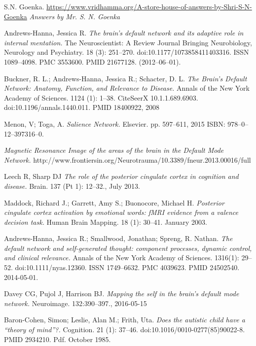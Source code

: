\documentclass[twocolumn]{article}
\begin{document}
\begin{thebibliography}{9}
\raggedright

  S.N. Goenka.
  \url{https://www.vridhamma.org/A-store-house-of-answers-by-Shri-S-N-Goenka}
  \textit{Answers by Mr. S. N. Goenka}

  Andrews-Hanna, Jessica R.
  \textit{The brain’s default network and its adaptive role in internal mentation.}
  The Neuroscientist: A Review Journal Bringing Neurobiology, Neurology and
  Psychiatry. 18 (3): 251–270. doi:10.1177/1073858411403316. ISSN 1089–4098. PMC
  3553600. PMID 21677128. (2012–06–01).

  Buckner, R. L.; Andrews-Hanna, Jessica R.; Schacter, D. L.
  \textit{The Brain's Default Network: Anatomy, Function, and Relevance to Disease.}
  Annals of the New York Academy of Sciences. 1124 (1): 1–38. CiteSeerX
  10.1.1.689.6903. doi:10.1196/annals.1440.011. PMID 18400922, 2008

  Menon, V; Toga, A.
  \textit{Salience Network.}
  Elsevier. pp. 597–611, 2015
  ISBN: 978–0–12–397316–0.

  \textit{Magnetic Resonance Image of the areas of the brain in the Default Mode Network.}
  http://www.frontiersin.org/Neurotrauma/10.3389/fneur.2013.00016/full

  Leech R, Sharp DJ
  \textit{The role of the posterior cingulate cortex in cognition and disease.}
  Brain. 137 (Pt 1): 12–32., July 2013.

  Maddock, Richard J.; Garrett, Amy S.; Buonocore, Michael H.
  \textit{Posterior cingulate cortex activation by emotional words: fMRI evidence from a
    valence decision task.}
  Human Brain Mapping. 18 (1): 30–41. January 2003.

  Andrews-Hanna, Jessica R.; Smallwood, Jonathan; Spreng, R. Nathan.
  \textit{The default network and self-generated thought: component processes,
    dynamic control, and clinical relevance.}
  Annals of the New York Academy of Sciences. 1316(1):
  29–52. doi:10.1111/nyas.12360. ISSN 1749–6632. PMC 4039623. PMID 24502540. 2014-05-01.

  Davey CG, Pujol J, Harrison BJ.
  \textit{Mapping the self in the brain’s default mode network.}
  Neuroimage. 132:390–397., 2016-05-15

  Baron-Cohen, Simon; Leslie, Alan M.; Frith, Uta.
  \textit{Does the autistic child have a ``theory of mind''?.}
  Cognition. 21 (1): 37–46. doi:10.1016/0010-0277(85)90022-8. PMID
  2934210. Pdf. October 1985.


\end{thebibliography}
\end{document}
